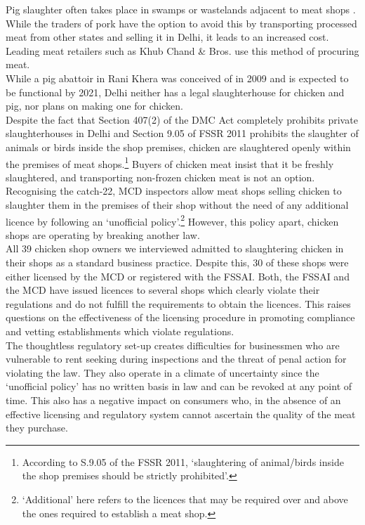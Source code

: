\documentclass[a4paper, 12pt, twoside]{article}
\begin{document}
Pig slaughter often takes place in swamps or wastelands adjacent to meat shops \parencite{tnnnews}. While the traders of pork have the option to avoid this by transporting processed meat from other states and selling it in Delhi, it leads to an increased cost. Leading meat retailers such as Khub Chand \& Bros. use this method of procuring meat.\\

While a pig abattoir in Rani Khera was conceived of in 2009 and is expected to be functional by 2021, Delhi neither has a legal slaughterhouse for chicken and pig, nor plans on making one for chicken. \\

Despite the fact that Section 407(2) of the DMC Act completely prohibits private slaughterhouses in Delhi and Section 9.05 of FSSR 2011 prohibits the slaughter of animals or birds inside the shop premises, chicken are slaughtered openly within the premises of meat shops.\footnote{According to S.9.05 of the FSSR 2011, ‘slaughtering of animal/birds inside the shop premises should be strictly prohibited’.} Buyers of chicken meat insist that it be freshly slaughtered, and transporting non-frozen chicken meat is not an option.\\

Recognising the catch-22, MCD inspectors allow meat shops selling chicken to slaughter them in the premises of their shop without the need of any additional licence by following an ‘unofficial policy’.\footnote{‘Additional’ here refers to the licences that may be required over and above the ones required to establish a meat shop.} However, this policy apart, chicken shops are operating by breaking another law. \\

All 39 chicken shop owners we interviewed admitted to slaughtering chicken in their shops as a standard business practice. Despite this, 30 of these shops were either licensed by the MCD or registered with the FSSAI. Both, the FSSAI and the MCD have issued licences to several shops which clearly violate their regulations and do not fulfill the requirements to obtain the licences. This raises questions on the effectiveness of the licensing procedure in promoting compliance and vetting establishments which violate regulations. \\

The thoughtless regulatory set-up creates difficulties for businessmen who are vulnerable to rent seeking during inspections and the threat of penal action for violating the law. They also operate in a climate of uncertainty since the ‘unofficial policy’ has no written basis in law and can be revoked at any point of time. This also has a negative impact on consumers who, in the absence of an effective licensing and regulatory system cannot ascertain the quality of the meat they purchase. \\
\end{document}
